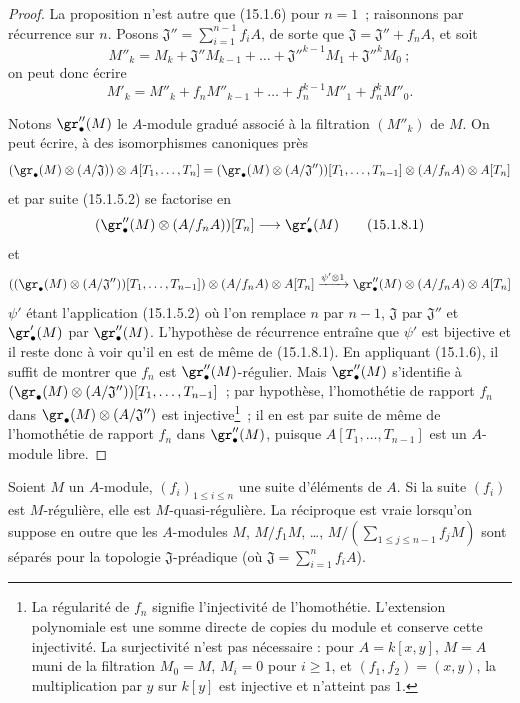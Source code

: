 \begin{proof}
La proposition n'est autre que (15.1.6) pour $n=1$~; raisonnons par récurrence
sur $n$. Posons
$\mathfrak{J}''=\sum_{i=1}^{n-1}f_iA$,
de sorte que $\mathfrak{J}=\mathfrak{J}''+f_nA$, et soit
\[
  M''_k=M_k+\mathfrak{J}''M_{k-1}+\ldots+
  \mathfrak{J}''^{k-1}M_1+\mathfrak{J}''^kM_0~;
\]
on peut donc écrire
\[
  M'_k=M''_k+f_nM''_{k-1}+\ldots+f_n^{k-1}M''_1+f_n^kM''_0.
\]

Notons $\gr''_\bullet(M)$ le $A$-module gradué associé à la filtration
$(M''_k)$ de $M$. On peut écrire, à des isomorphismes canoniques près
\[
  (\gr_\bullet(M)\otimes(A/\mathfrak{J}))\otimes A[T_1,\ldots,T_n]
  =
  (\gr_\bullet(M)\otimes(A/\mathfrak{J}''))[T_1,\ldots,T_{n-1}]
  \otimes(A/f_nA)\otimes A[T_n]
\]
et par suite (15.1.5.2) se factorise en
\[
  (\gr''_\bullet(M)\otimes(A/f_nA))[T_n]\longrightarrow\gr'_\bullet(M)
  \tag{15.1.8.1}\label{0.15.1.8.1-fr}
\]
et
\[
  ((\gr_\bullet(M)\otimes(A/\mathfrak{J}''))[T_1,\ldots,T_{n-1}])
  \otimes(A/f_nA)\otimes A[T_n]
  \xrightarrow{\psi'\otimes1}
  \gr''_\bullet(M)\otimes(A/f_nA)\otimes A[T_n]
\]
$\psi'$ étant l'application (15.1.5.2) où l'on remplace $n$ par $n-1$,
$\mathfrak{J}$ par $\mathfrak{J}''$ et $\gr'_\bullet(M)$ par
$\gr''_\bullet(M)$. L'hypothèse de récurrence entraîne que $\psi'$ est
bijective et il reste donc à voir qu'il en est de même de (15.1.8.1). En
appliquant (15.1.6), il suffit de montrer que $f_n$ est
$\gr''_\bullet(M)$-régulier. Mais $\gr''_\bullet(M)$ s'identifie à
$(\gr_\bullet(M)\otimes(A/\mathfrak{J}''))[T_1,\ldots,T_{n-1}]$~;
par hypothèse, l'homothétie de rapport $f_n$ dans
$\gr_\bullet(M)\otimes(A/\mathfrak{J}'')$ est injective\footnote{La régularité de $f_n$ signifie l'injectivité de l'homothétie. L'extension polynomiale est une somme directe de copies du module et conserve cette injectivité. La surjectivité n'est pas nécessaire : pour $A=k[x,y]$, $M=A$ muni de la filtration $M_0=M$, $M_i=0$ pour $i\geq1$, et $(f_1,f_2)=(x,y)$, la multiplication par $y$ sur $k[y]$ est injective et n'atteint pas $1$.}~; il en est par suite
de même de l'homothétie de rapport $f_n$ dans $\gr''_\bullet(M)$, puisque
$A[T_1,\ldots,T_{n-1}]$ est un $A$-module libre.
\end{proof}

\begin{proposition}[15.1.9]
\label{0.15.1.9-fr}
Soient $M$ un $A$-module, $(f_i)_{1\leq i\leq n}$ une suite d'éléments de $A$.
Si la suite $(f_i)$ est $M$-régulière, elle est $M$-quasi-régulière. La
réciproque est vraie lorsqu'on suppose en outre que les $A$-modules
$M$, $M/f_1M$, \ldots, $M/\left(\sum_{1\leq j\leq n-1}f_jM\right)$
sont séparés pour la topologie $\mathfrak{J}$-préadique (où
$\mathfrak{J}=\sum_{i=1}^n f_iA$).
\end{proposition}

